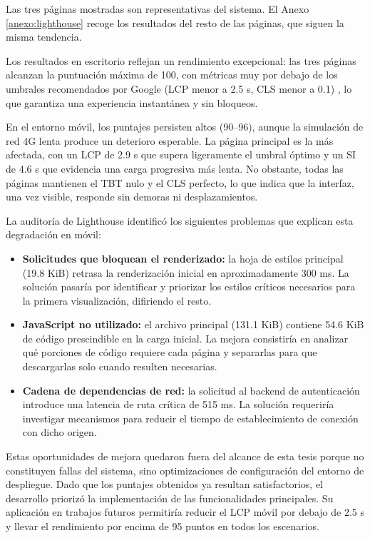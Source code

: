 Las tres páginas mostradas son representativas del sistema. 
El Anexo \ref{anexo:lighthouse} recoge los resultados del resto de las páginas, que siguen la misma tendencia.

Los resultados en escritorio reflejan un rendimiento excepcional: las tres páginas alcanzan la puntuación máxima de 100, con métricas muy por debajo de los umbrales recomendados por Google (LCP menor a 2.5 s, CLS menor a 0.1)\cite{googlewebdev} , lo que garantiza una experiencia instantánea y sin bloqueos.

En el entorno móvil, los puntajes persisten altos (90--96), aunque la simulación de red 4G lenta produce un deterioro esperable. 
La página principal es la más afectada, con un LCP de 2.9 s que supera ligeramente el umbral óptimo y un SI de 4.6 s que evidencia una carga progresiva más lenta. 
No obstante, todas las páginas mantienen el TBT nulo y el CLS perfecto, lo que indica que la interfaz, una vez visible, responde sin demoras ni desplazamientos.

La auditoría de Lighthouse identificó los siguientes problemas que explican esta degradación en móvil:

\begin{itemize}
    \item \textbf{Solicitudes que bloquean el renderizado:} la hoja de estilos principal (19.8 KiB) retrasa la renderización inicial en aproximadamente 300 ms. La solución pasaría por identificar y priorizar los estilos críticos necesarios para la primera visualización, difiriendo el resto.

    \item \textbf{JavaScript no utilizado:} el archivo principal (131.1 KiB) contiene 54.6 KiB de código prescindible en la carga inicial. 
    La mejora consistiría en analizar qué porciones de código requiere cada página y separarlas para que descargarlas solo cuando resulten necesarias.

    \item \textbf{Cadena de dependencias de red:} la solicitud al backend de autenticación introduce una latencia de ruta crítica de 515 ms. La solución requeriría investigar mecanismos para reducir el tiempo de establecimiento de conexión con dicho origen.
\end{itemize}

Estas oportunidades de mejora quedaron fuera del alcance de esta tesis porque no constituyen fallas del sistema, sino optimizaciones de configuración del entorno de despliegue.
Dado que los puntajes obtenidos ya resultan satisfactorios, el desarrollo priorizó la implementación de las funcionalidades principales.
Su aplicación en trabajos futuros permitiría reducir el LCP móvil por debajo de 2.5 s y llevar el rendimiento por encima de 95 puntos en todos los escenarios.

